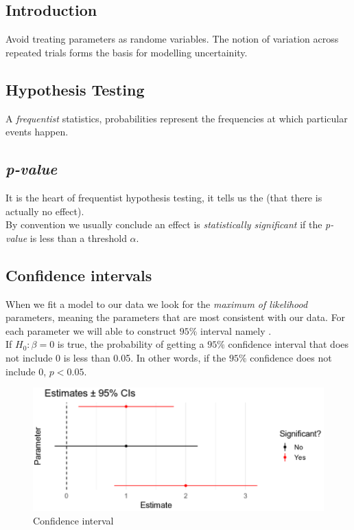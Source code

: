 \subsection{Introduction}
Avoid treating parameters as randome variables.
The notion of variation across repeated trials forms the basis for modelling
uncertainity.


\subsection{Hypothesis Testing}
A \emph{frequentist} statistics, probabilities represent the frequencies at which 
particular events happen.

\subsection{\emph{p-value}}
It is the heart of frequentist hypothesis testing, it tells us the  (that there is actually no effect).\\
By convention we usually conclude an effect is \emph{statistically significant} if the 
\emph{p-value} is less than a threshold $\alpha$.

\subsection{Confidence intervals}
When we fit a model to our data we look for the \emph{maximum of likelihood} parameters,
meaning the parameters that are most consistent with our data. 
For each parameter we will able to construct $95\%$ interval namely .\\
If $H_{0}: \beta=0$ is true, the probability of getting a $95\%$ confidence interval that
does not include 0 is less than 0.05. In other words, if the $95\%$ confidence does not 
include 0, $p<0.05$.
\begin{figure}[H]
	\begin{center}
		\includegraphics[width=\textwidth]{./chapters/2_statistics/04_frequentist_approach/4_images/1_estimates.png}
	\end{center}
	\caption{Confidence interval}
	\label{fig:2.4.1_estimates}
\end{figure}

